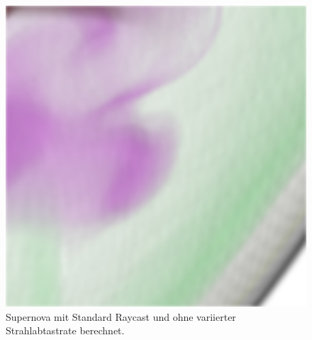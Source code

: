 \begin{figure}[]
\begin{minipage}[t]{0.3\textwidth}
	\end{minipage}
	\hfill
	\begin{minipage}[t]{0.3\textwidth}
		\centering
		\includegraphics[width=1\textwidth]{../../Neue_Messungen/Supernova/cut/st/st_3.png}
	\end{minipage}
	\caption{Supernova mit Standard Raycast und ohne variierter Strahlabtastrate berechnet.}
	\label{fig::res::sn_comp_st}
\end{figure}

